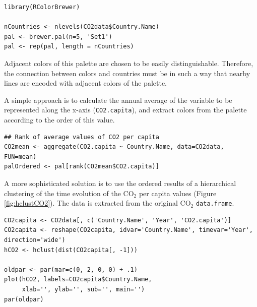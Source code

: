 \documentclass[smallroyalvopaper]{memoir}
\begin{document}

\lstset{language=R,numbers=none}
\begin{lstlisting}
library(RColorBrewer)

nCountries <- nlevels(CO2data$Country.Name)
pal <- brewer.pal(n=5, 'Set1')
pal <- rep(pal, length = nCountries)
\end{lstlisting}

Adjacent colors of this palette are chosen to be easily
distinguishable. Therefore, the connection between colors and
countries must be in such a way that nearby lines are encoded
with adjacent colors of the palette.

A simple approach is to calculate the annual average of the
variable to be represented along the x-axis (\texttt{CO2.capita}), and
extract colors from the palette according to the order of this
value.  


\lstset{language=R,numbers=none}
\begin{lstlisting}
## Rank of average values of CO2 per capita
CO2mean <- aggregate(CO2.capita ~ Country.Name, data=CO2data, FUN=mean)
palOrdered <- pal[rank(CO2mean$CO2.capita)]
\end{lstlisting}

A more sophisticated solution is to use the ordered results of a
hierarchical clustering of the time evolution of the $\mathrm{CO_2}$ per capita
values (Figure \ref{fig:hclustCO2}). The data is extracted from the
original $\mathrm{CO_2}$ \texttt{data.frame}.  


\lstset{language=R,numbers=none}
\begin{lstlisting}
CO2capita <- CO2data[, c('Country.Name', 'Year', 'CO2.capita')]
CO2capita <- reshape(CO2capita, idvar='Country.Name', timevar='Year', direction='wide')
hCO2 <- hclust(dist(CO2capita[, -1]))

oldpar <- par(mar=c(0, 2, 0, 0) + .1)
plot(hCO2, labels=CO2capita$Country.Name,
     xlab='', ylab='', sub='', main='')
par(oldpar)
\end{lstlisting}
\end{document}
